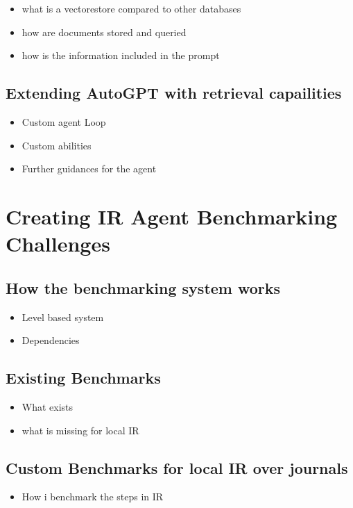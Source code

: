 \documentclass[english, version-2022-01]{uzl-thesis}
\begin{document}
\begin{itemize}
	\item what is a vectorestore compared to other databases
	\item how are documents stored and queried
	\item how is the information included in the prompt
\end{itemize}


\section{Extending AutoGPT with retrieval capailities}

\begin{itemize}
	\item Custom agent Loop
	\item Custom abilities
	\item Further guidances for the agent
\end{itemize}

\chapter{Creating IR Agent Benchmarking Challenges}

\section{How the benchmarking system works}

\begin{itemize}
	\item Level based system
	\item Dependencies
\end{itemize}
\section{Existing Benchmarks}

\begin{itemize}
	\item What exists
	\item what is missing for local IR 
\end{itemize}

\section{Custom Benchmarks for local IR over journals}

\begin{itemize}
	\item How i benchmark the steps in IR
\end{itemize}
\end{document}
